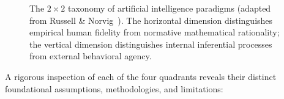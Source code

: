 \begin{figure}[htbp]
{
}
\caption{The $2 \times 2$ taxonomy of artificial intelligence paradigms (adapted from Russell \& Norvig~\cite{russell2020artificial}). The horizontal dimension distinguishes empirical human fidelity from normative mathematical rationality; the vertical dimension distinguishes internal inferential processes from external behavioral agency.}
\label{fig:ai_quadrants_schema}
\end{figure}

A rigorous inspection of each of the four quadrants reveals their distinct foundational assumptions, methodologies, and limitations:

